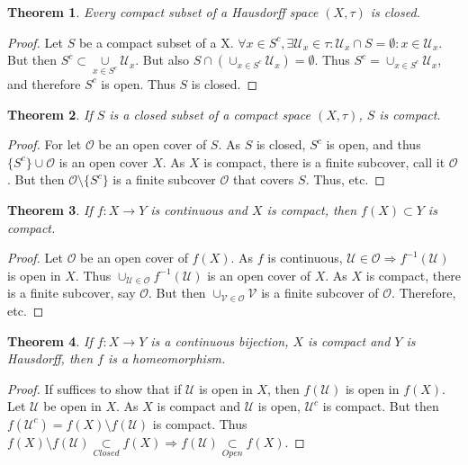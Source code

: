 \documentclass[12pt,oneside]{book}
\theoremstyle{mystyle}
\newtheorem{theorem}{Theorem}[section]
\begin{document}
\begin{theorem}
Every compact subset of a Hausdorff space $(X,\tau)$ is closed.
\end{theorem}
\begin{proof}
Let $S$ be a compact subset of a X. $\forall x\in S^c, \exists \mathcal{U}_x\in \tau:\mathcal{U}_x\cap S = \emptyset:x\in \mathcal{U}_x$. But then $S^c \subset \underset{x\in S^c}\cup\mathcal{U}_x$. But also $S\cap (\cup_{x\in S^c}\mathcal{U}_x) = \emptyset$. Thus $S^c = \cup_{x\in S^c}\mathcal{U}_x$, and therefore $S^c$ is open. Thus $S$ is closed.
\end{proof}

\begin{theorem}
If $S$ is a closed subset of a compact space $(X,\tau)$, $S$ is compact.
\end{theorem}
\begin{proof}
For let $\mathcal{O}$ be an open cover of $S$. As $S$ is closed, $S^c$ is open, and thus $\{S^c\} \cup \mathcal{O}$ is an open cover $X$. As $X$ is compact, there is a finite subcover, call it $\mathscr{O}$. But then $\mathscr{O}\setminus \{S^c\}$ is a finite subcover $\mathcal{O}$ that covers $S$. Thus, etc.
\end{proof}

\begin{theorem}
If $f:X\rightarrow Y$ is continuous and $X$ is compact, then $f(X)\subset Y$ is compact.
\end{theorem}
\begin{proof}
Let $\mathcal{O}$ be an open cover of $f(X)$. As $f$ is continuous, $\mathcal{U}\in\mathcal{O}\Rightarrow f^{-1}(\mathcal{U})$ is open in $X$. Thus $\cup_{\mathcal{U}\in \mathcal{O}} f^{-1}(\mathcal{U})$ is an open cover of $X$. As $X$ is compact, there is a finite subcover, say $\mathscr{O}$. But then $\cup_{\mathcal{V}\in \mathscr{O}} \mathcal{V}$ is a finite subcover of $\mathcal{O}$. Therefore, etc.
\end{proof}

\begin{theorem}
If $f:X\rightarrow Y$ is a continuous bijection, $X$ is compact and $Y$ is Hausdorff, then $f$ is a homeomorphism.
\end{theorem}
\begin{proof}
If suffices to show that if $\mathcal{U}$ is open in $X$, then $f(\mathcal{U})$ is open in $f(X)$. Let $\mathcal{U}$ be open in $X$. As $X$ is compact and $\mathcal{U}$ is open, $\mathcal{U}^c$ is compact. But then $f(\mathcal{U}^c) = f(X)\setminus f(\mathcal{U})$ is compact. Thus $f(X)\setminus f(\mathcal{U})\underset{Closed}\subset f(X)\Rightarrow f(\mathcal{U})\underset{Open}\subset f(X)$.
\end{proof}
\end{document}
